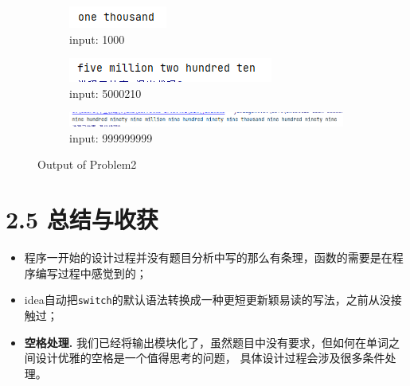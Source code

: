 \begin{figure}[H]
    \begin{subfigure}{0.17\linewidth}
		\centering
		\includegraphics[width = 1\linewidth]{../pic/2/2.4.png}
        \caption{input: 1000}
	\end{subfigure}
	\begin{subfigure}{0.27\linewidth}
		\centering
		\includegraphics[width=1\linewidth]{../pic/2/2.5.png}
        \caption{input: 5000210}
	\end{subfigure}
	\begin{subfigure}{1\linewidth}
		\centering
		\includegraphics[width=0.9\linewidth]{../pic/2/2.6.png}
        \caption{input: 999999999}
	\end{subfigure}
	\caption{Output of Problem2}
\end{figure}

\section{2.5 总结与收获}

\begin{itemize}
    \item 程序一开始的设计过程并没有题目分析中写的那么有条理，函数的需要是在程序编写过程中感觉到的；
    \item idea自动把\lstinline{switch}的默认语法转换成一种更短更新颖易读的写法，之前从没接触过；
    \item \textbf{空格处理.} 我们已经将输出模块化了，虽然题目中没有要求，但如何在单词之间设计优雅的空格是一个值得思考的问题，
        具体设计过程会涉及很多条件处理。
\end{itemize}